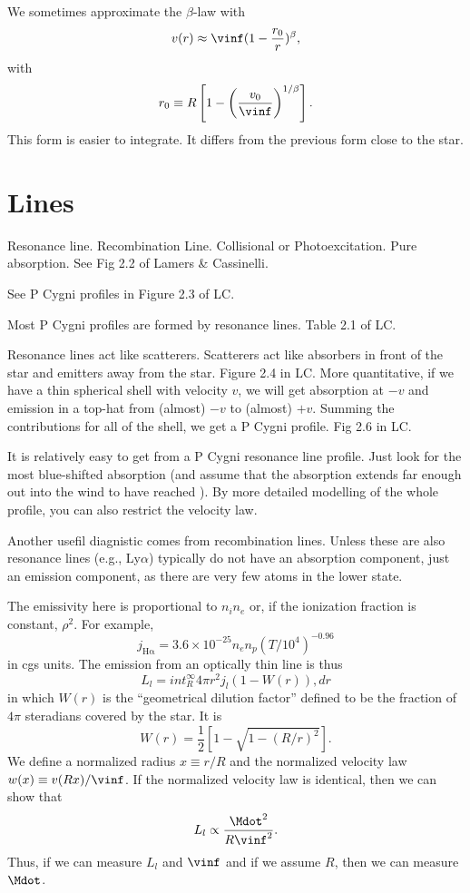 We sometimes approximate the $\beta$-law with
$$
v(r) \approx \vinf(1-\frac{r_0}{r})^\beta,
$$
with
$$
r_0 \equiv R\left[1-\left(\frac{v_0}{\vinf}\right)^{1/\beta}\right].
$$
This form is easier to integrate. It differs from the previous form close to the star.

\section{Lines}

Resonance line. Recombination Line. Collisional or Photoexcitation. Pure absorption. See Fig 2.2 of Lamers \& Cassinelli.

See P Cygni profiles in Figure 2.3 of LC.

Most P Cygni profiles are formed by resonance lines. Table 2.1 of LC.

Resonance lines act like scatterers. Scatterers act like absorbers in front of the star and emitters away from the star. Figure 2.4 in LC. More quantitative, if we have a thin spherical shell with velocity $v$, we will get absorption at $-v$ and emission in a top-hat from (almost) $-v$ to (almost) $+v$. Summing the contributions for all of the shell, we get a P Cygni profile. Fig 2.6 in LC.

It is relatively easy to get {\vinf} from a P Cygni resonance line profile. Just look for the most blue-shifted absorption (and assume that the absorption extends far enough out into the wind to have reached {\vinf}). By more detailed modelling of the whole profile, you can also restrict the velocity law.

Another usefil diagnistic comes from recombination lines. Unless these are also resonance lines (e.g., Ly$\alpha$) typically do not have an absorption component, just an emission component, as there are very few atoms in the lower state.

The emissivity here is proportional to $n_in_e$ or, if the ionization fraction is constant, $\rho^2$. For example,
$$
j_\mathrm{H\alpha} = 3.6 \times 10^{-25} n_e n_p (T/10^4)^{-0.96}
$$
in cgs units. The emission from an optically thin line is thus
$$
L_l = int_R^\infty 4\pi r^2 j_l(1-W(r)),dr
$$
in which $W(r)$ is the ``geometrical dilution factor'' defined to be the fraction of $4\pi$ steradians covered by the star. It is
$$
W(r) = \frac{1}{2}\left[1-\sqrt{1-(R/r)^2}\right].
$$
We define a normalized radius $x \equiv r/R$ and the normalized velocity law $w(x) \equiv v(Rx)/\vinf$. If the normalized velocity law is identical, then we can show that
$$
L_l \propto \frac{\Mdot^2}{R \vinf^2}.
$$
Thus, if we can measure $L_l$ and $\vinf$ and if we assume $R$, then we can measure $\Mdot$.

